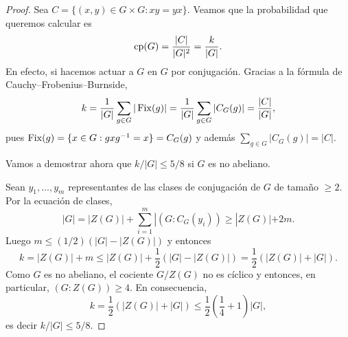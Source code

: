 \begin{proof}
    Sea $C=\{(x,y)\in G\times G:xy=yx\}$. Veamos que la probabilidad que queremos calcular 
    es
    \[
    \operatorname{cp}(G)=\frac{|C|}{|G|^2}=\frac{k}{|G|}.
    \]
    En efecto, si hacemos actuar a $G$ en $G$ por conjugación. Gracias a 
    la fórmula de Cauchy--Frobenius--Burnside, 
    \[
    k=\frac{1}{|G|}\sum_{g\in G}|\operatorname{Fix}(g)|=\frac{1}{|G|}\sum_{g\in G}|C_G(g)|=\frac{|C|}{|G|},
    \]
    pues $\operatorname{Fix}(g)=\{x\in G:gxg^{-1}=x\}=C_G(g)$ y además $\sum_{g\in G}|C_G(g)|=|C|$. 

    Vamos a demostrar ahora que $k/|G|\leq 5/8$ si $G$ es no abeliano. 
   
    Sean $y_1,\dots,y_m$ representantes de las clases de conjugación de $G$ de tamaño $\geq2$. Por 
    la ecuación de clases, 
    \[
    |G|=|Z(G)|+\sum_{i=1}^m|(G:C_G(y_i))\geq |Z(G)|+2m.
    \]
    Luego $m\leq(1/2)(|G|-|Z(G)|)$ y entonces
    \[
    k=|Z(G)|+m\leq |Z(G)|+\frac12(|G|-|Z(G)|)=\frac12(|Z(G)|+|G|).
    \]
    Como $G$ es no abeliano, el cociente $G/Z(G)$ no es 
    cíclico y entonces, en particular, $(G:Z(G))\geq4$. En consecuencia, 
    \[
    k=\frac12(|Z(G)|+|G|)\leq\frac12\left(\frac14+1\right)|G|,
    \]
    es decir $k/|G|\leq 5/8$. 
\end{proof}

    
    
    

